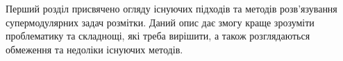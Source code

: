 Перший розділ присвячено огляду існуючих підходів та методів
розв'язування супермодулярних задач розмітки. Даний опис дає змогу 
краще зрозуміти проблематику та складнощі, які треба вирішити, а також
розглядаються обмеження та недоліки існуючих методів.